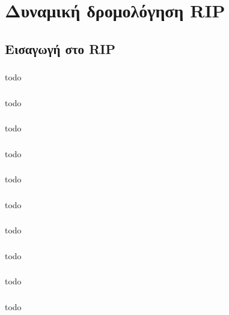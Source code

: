 \documentclass[a4paper, 12pt]{article}
\begin{document}
\section{Δυναμική δρομολόγηση RIP}

	\subsection{Εισαγωγή στο RIP}

		\subsubsection{}
			todo

		\subsubsection{}
			todo

		\subsubsection{}
			todo

		\subsubsection{}
			todo

		\subsubsection{}
			todo

		\subsubsection{}
			todo

		\subsubsection{}
			todo

		\subsubsection{}
			todo

		\subsubsection{}
			todo

		\subsubsection{}
			todo
\end{document}
